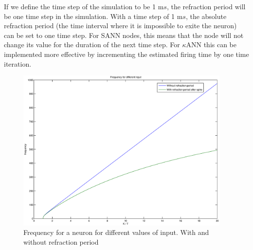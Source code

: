 If we define the time step of the simulation to be 1 m$s$, the refraction period will be one time step in the simulation.
With a time step of 1 m$s$, the absolute refraction period (the time interval where it is impossible to exite the neuron) can be set to one time step. 
For SANN nodes, this means that the node will not change its value for the duration of the next time step. 
For $\kappa$ANN this can be implemented more effective by incrementing the estimated firing time by one time iteration. 


\begin{figure}[bhtp]
	\begin{center}
		\includegraphics[width=0.95\textwidth]{frekvensPlotRefractionPeriod.eps}
	\end{center}
	\caption{Frequency for a neuron for different values of input. With and without refraction period}
	\label{figFrekvensMedOgUtenRefractionPeriod}
\end{figure}







